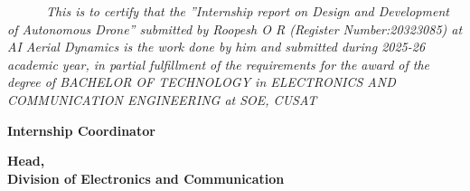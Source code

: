 \vspace*{1.2cm}
\begin{center}
	\thispagestyle{empty}
	\vspace{1cm}
	\par
	\vspace{.7cm}
\end{center}
\textit{\ \ \ \ \ \ 
This is to certify that the ”Internship report on Design and Development of Autonomous Drone” submitted by Roopesh O R (Register Number:20323085) at AI Aerial Dynamics is the work done by him and submitted during 2025-26 academic year, in partial fulfillment of the requirements for the award of the degree of BACHELOR OF TECHNOLOGY in ELECTRONICS AND COMMUNICATION ENGINEERING at SOE, CUSAT
}
\begin{center}
	\vspace{3cm}
	\begin{minipage}[t]{.4\linewidth}
		\begin{flushleft}
			\textbf{Internship Coordinator}\\
		\end{flushleft}
	\end{minipage}%
	\hfill%
	\begin{minipage}[t]{.55	\linewidth}%
		\begin{flushright}
			\textbf{Head,}\\
			\textbf{Division of Electronics and Communication}\\
		\end{flushright}
	\end{minipage}
\end{center}
\vspace*{\fill}
